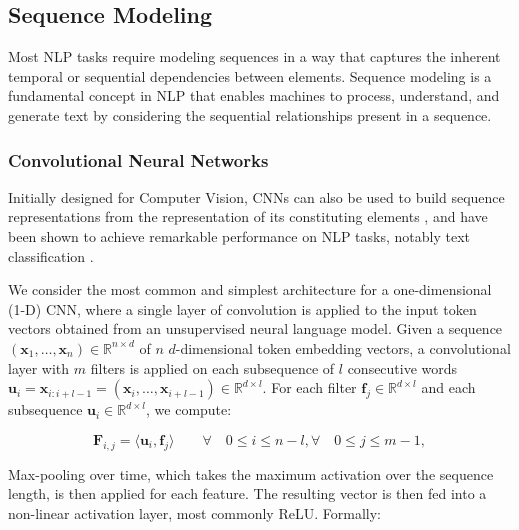 \subsection{Sequence Modeling}

Most \ac{NLP} tasks require modeling sequences in a way that captures the inherent temporal or sequential dependencies between elements. Sequence modeling is a fundamental concept in NLP that enables machines to process, understand, and generate text by considering the sequential relationships present in a sequence.

\subsubsection{Convolutional Neural Networks}

Initially designed for Computer Vision, \acp{CNN} can also be used to build sequence representations from the representation of its constituting elements \citep{collobert2008unified, kim2014convolutional}, and have been shown to achieve remarkable performance on \ac{NLP} tasks, notably text classification \citep{duque2019squeezed, wang2015semantic, liu2020multichannel}. 

We consider the most common and simplest architecture for a one-dimensional (1-D) \ac{CNN}, where a single layer of convolution is applied to the input token vectors obtained from an unsupervised neural language model. Given a sequence $(\bm{x}_1, \ldots, \bm{x}_n) \in \mathbb{R}^{n \times d}$ of $n$ $d$-dimensional token embedding vectors, a convolutional layer with $m$ filters is applied on each subsequence of $l$ consecutive words $\bm{u}_i = \bm{x}_{i:i+l-1} = (\bm{x}_i, \ldots, \bm{x}_{i+l-1}) \in \mathbb{R}^{d \times l}$. For each filter $\bm{f}_j \in \mathbb{R}^{d \times l}$ and each subsequence $\bm{u}_i \in \mathbb{R}^{d \times l}$, we compute:

\begin{equation}
\bm{F}_{i,j} = \langle \bm{u}_i, \bm{f}_j\rangle \qquad \forall \quad 0 \leq i \leq n-l, \forall \quad 0 \leq j \leq m-1,
\end{equation}

Max-pooling over time, which takes the maximum activation over the sequence length, is then applied for each feature. The resulting vector is then fed into a non-linear activation layer, most commonly ReLU. Formally:

